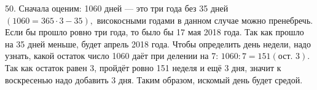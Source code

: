 50. Сначала оценим: 1060 дней --- это три года без 35 дней $(1060=365\cdot3-35),$ високосными годами в данном случае можно пренебречь. Если бы прошло ровно три года, то было бы 17 мая 2018 года. Так как прошло на 35 дней меньше, будет апрель 2018 года. Чтобы определить день недели, надо узнать, какой остаток число 1060 даёт при делении на 7: $1060:7=151 (\text{ост. } 3).$Так как остаток равен 3, пройдёт ровно 151 неделя и ещё 3 дня, значит к воскресенью надо добавить 3 дня. Таким образом, искомый день будет средой.\\
